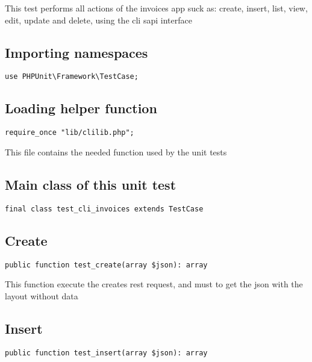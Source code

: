 \documentclass[a4paper]{book}
\begin{document}
This test performs all actions of the invoices app suck as: create, insert,
list, view, edit, update and delete, using the cli sapi interface

\hypertarget{toc21}{}
\subsection{Importing namespaces}

\begin{lstlisting}
use PHPUnit\Framework\TestCase;
\end{lstlisting}

\hypertarget{toc22}{}
\subsection{Loading helper function}

\begin{lstlisting}
require_once "lib/clilib.php";
\end{lstlisting}

This file contains the needed function used by the unit tests

\hypertarget{toc23}{}
\subsection{Main class of this unit test}

\begin{lstlisting}
final class test_cli_invoices extends TestCase
\end{lstlisting}

\hypertarget{toc24}{}
\subsection{Create}

\begin{lstlisting}
public function test_create(array $json): array
\end{lstlisting}

This function execute the creates rest request, and must to get the
json with the layout without data

\hypertarget{toc25}{}
\subsection{Insert}

\begin{lstlisting}
public function test_insert(array $json): array
\end{lstlisting}
\end{document}

